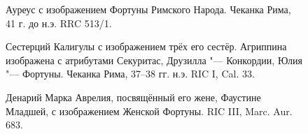 \begin{appendices}
\begin{figure}[ht!]
\caption{Ауреус с изображением Фортуны Римского Народа. Чеканка Рима, 41 г. до н.э. RRC 513/1. }\label{pic:RRC513}
\end{figure}

\begin{figure}[ht!]
\caption{Сестерций Калигулы с изображением трёх его сестёр. Агриппина изображена с атрибутами Секуритас, Друзилла "--- Конкордии, Юлия "--- Фортуны. Чеканка Рима, 37--38 гг. н.э. RIC I, Cal. 33.}\label{pic:CaligulaeSorores}
\end{figure}


\begin{figure}[ht!]
\caption{Денарий Марка Аврелия, посвящённый его жене, Фаустине Младшей, с изображением Женской Фортуны. RIC III, Marc. Aur. 683. }\label{pic:FortunaMuliebris}
\end{figure}


\end{appendices}
